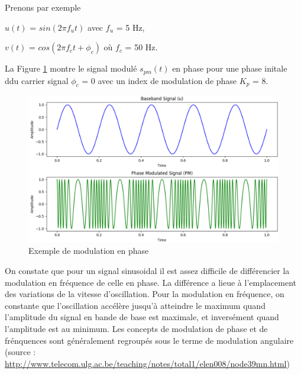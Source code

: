 \vspace{0.1cm}

Prenons par exemple

\vspace{0.1cm}

$u(t)$ = $sin(2\pi f_{u}t)$ avec $f_{u}$ = 5 Hz,

$v(t)$ = $cos(2\pi f_{c}t + \phi_{c})$ où $f_{c}$ = 50 Hz.

\vspace{0.1cm}

La Figure \ref{term3} montre le signal modulé $s_{pm}(t)$ en phase pour une phase initale ddu carrier signal $\phi_{c}$ = 0 avec un index de modulation de phase $K_{p}$ = 8.

\newpage

\begin{figure}[h]
\centering

\includegraphics[scale=0.5]{images/PM_mod.PNG}
\caption{Exemple de modulation en phase}\label{term3}
\end{figure}

On constate que pour un signal sinusoidal il est assez difficile de différencier la modulation en fréquence de celle en phase. La différence a lieue à l'emplacement des variations de la vitesse d'oscillation. Pour la modulation en fréquence, on constante que l'oscillation accélère jusqu'à atteindre le maximum quand l'amplitude du signal en bande de base est maximale, et inversément quand l'amplitude est au minimum. Les concepts de modulation de phase et de frénquences sont généralement regroupés sous le terme de modulation angulaire (source : \href{http://www.telecom.ulg.ac.be/teaching/notes/total1/elen008/node39_mn.html}{http://www.telecom.ulg.ac.be/teaching/notes/total1/elen008/node39mn.html})


